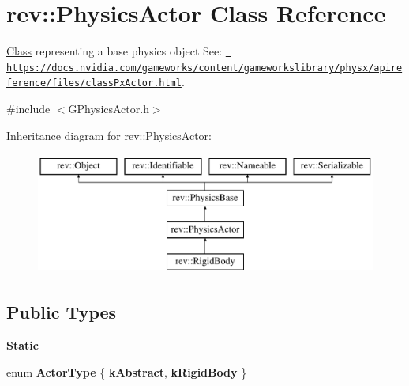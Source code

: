 \hypertarget{classrev_1_1_physics_actor}{}\section{rev\+::Physics\+Actor Class Reference}
\label{classrev_1_1_physics_actor}


\mbox{\hyperlink{struct_class}{Class}} representing a base physics object See\+: \href{https://docs.nvidia.com/gameworks/content/gameworkslibrary/physx/apireference/files/classPxActor.html}{\texttt{ https\+://docs.\+nvidia.\+com/gameworks/content/gameworkslibrary/physx/apireference/files/class\+Px\+Actor.\+html}}.  




{\ttfamily \#include $<$G\+Physics\+Actor.\+h$>$}

Inheritance diagram for rev\+::Physics\+Actor\+:\begin{figure}[H]
\begin{center}
\leavevmode
\includegraphics[height=4.000000cm]{classrev_1_1_physics_actor}
\end{center}
\end{figure}
\subsection*{Public Types}
\begin{Indent}\textbf{ Static}\par
\begin{DoxyCompactItemize}
\item 
\mbox{\label{classrev_1_1_physics_actor_ac258e5649445393a856e9b114ee7f30f}} 
enum {\bfseries Actor\+Type} \{ {\bfseries k\+Abstract}, 
{\bfseries k\+Rigid\+Body}
 \}
\end{DoxyCompactItemize}
\end{Indent}
